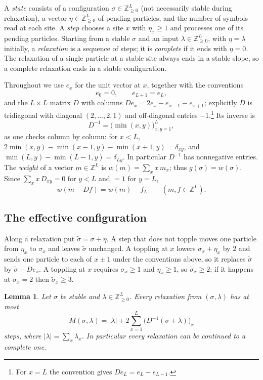 \documentclass[11pt]{amsart}
\newtheorem{lemma}[theorem]{Lemma}
\theoremstyle{definition}
\theoremstyle{remark}
\newcommand{\Z}{\mathbb{Z}}
\begin{document}
A \emph{state} consists of a configuration $\sigma\in\Z_{\ge0}^L$ (not necessarily stable during relaxation), a vector $\eta\in\Z_{\ge0}^L$ of pending particles, and the number of symbols read at each site. A \emph{step} chooses a site $x$ with $\eta_x\ge1$ and processes one of its pending particles. Starting from a stable $\sigma$ and an input $\lambda\in\Z_{\ge0}^L$, with $\eta=\lambda$ initially, a \emph{relaxation} is a sequence of steps; it is \emph{complete} if it ends with $\eta=0$. The relaxation of a single particle at a stable site always ends in a stable slope, so a complete relaxation ends in a stable configuration.

Throughout we use $e_x$ for the unit vector at $x$, together with the conventions
\[
e_0=0,\qquad e_{L+1}=e_L,
\]
and the $L\times L$ matrix $D$ with columns $De_x=2e_x-e_{x-1}-e_{x+1}$; explicitly $D$ is tridiagonal with diagonal $(2,\dots,2,1)$ and off-diagonal entries $-1$.\footnote{For $x=L$ the convention gives $De_L=e_L-e_{L-1}$.} Its inverse is
\begin{equation}\label{eq:Dinv}
D^{-1}=\bigl(\min(x,y)\bigr)_{x,y=1}^L ,
\end{equation}
as one checks column by column: for $x<L$, $2\min(x,y)-\min(x-1,y)-\min(x+1,y)=\delta_{xy}$, and $\min(L,y)-\min(L-1,y)=\delta_{Ly}$. In particular $D^{-1}$ has nonnegative entries. The \emph{weight} of a vector $m\in\Z^L$ is $w(m)=\sum_x x\,m_x$; thus $g(\sigma)=w(\sigma)$. Since $\sum_x x\,D_{xy}=0$ for $y<L$ and $=1$ for $y=L$,
\begin{equation}\label{eq:weightD}
w(m-Df)=w(m)-f_L\qquad(m,f\in\Z^L).
\end{equation}

\subsection{The effective configuration}
Along a relaxation put $\tilde\sigma=\sigma+\eta$. A step that does not topple moves one particle from $\eta_x$ to $\sigma_x$ and leaves $\tilde\sigma$ unchanged. A toppling at $x$ lowers $\sigma_x+\eta_x$ by $2$ and sends one particle to each of $x\pm1$ under the conventions above, so it replaces $\tilde\sigma$ by $\tilde\sigma-De_x$. A toppling at $x$ requires $\sigma_x\ge1$ and $\eta_x\ge1$, so $\tilde\sigma_x\ge2$; if it happens at $\sigma_x=2$ then $\tilde\sigma_x\ge3$.

\begin{lemma}\label{lem:term}
Let $\sigma$ be stable and $\lambda\in\Z_{\ge0}^L$. Every relaxation from $(\sigma,\lambda)$ has at most
\[
M(\sigma,\lambda)=|\lambda|+2\sum_{x=1}^L\bigl(D^{-1}(\sigma+\lambda)\bigr)_x
\]
steps, where $|\lambda|=\sum_x \lambda_x$. In particular every relaxation can be continued to a complete one.
\end{lemma}
\end{document}
